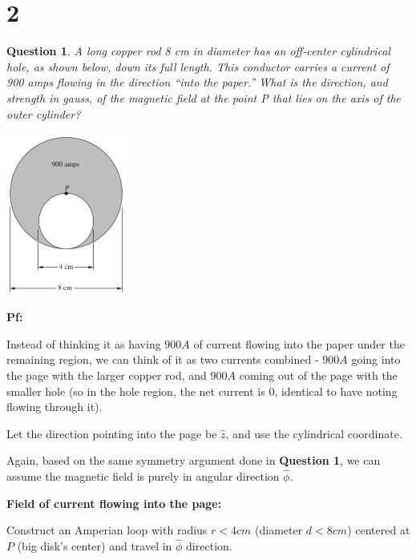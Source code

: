 \documentclass{article}
\newtheorem{question}{Question}
\begin{document}
\hfill

\hfill

\section*{2}
\begin{myBox}[]{}
    \begin{question}
        A long copper rod 8 cm in diameter has an off-center cylindrical
        hole, as shown below, down its full length. This conductor
        carries a current of 900 amps flowing in the direction “into the
        paper.” What is the direction, and strength in gauss, of the magnetic
        field at the point P that lies on the axis of the outer cylinder?
    \end{question}

    \begin{center}
        \includegraphics*[width=40mm]{Purcell 6.37.png}
    \end{center}
\end{myBox}

\textbf{Pf:}

Instead of thinking it as having $900A$ of current flowing into the paper under the remaining region,
we can think of it as two currents combined - $900A$ going into the page with the larger copper rod, 
and $900A$ coming out of the page with the smaller hole (so in the hole region, the net current is $0$, identical to have noting flowing through it).

Let the direction pointing into the page be $\hat{z}$, and use the cylindrical coordinate.

Again, based on the same symmetry argument done in \textbf{Question 1}, we can assume the magnetic field is purely in angular direction $\hat{\phi}$.

\hfill

\textbf{Field of current flowing into the page:}

Construct an Amperian loop with radius $r<4cm$ (diameter $d<8cm$) centered at $P$ (big disk's center) and travel in $\hat{\phi}$ direction.
\end{document}

